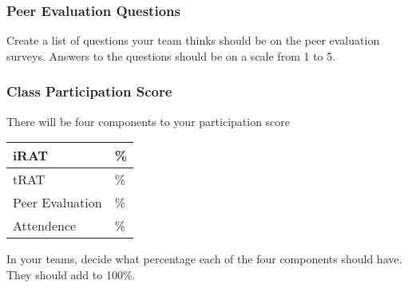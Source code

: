 \documentclass{beamer}
\begin{document}
\begin{frame} \frametitle{Peer Evaluation Questions}
Create a list of questions your team thinks should be on the peer evaluation surveys.  Answers to the questions should be on a scale from 1 to 5.
\vspace{4in}
\end{frame}

\begin{frame} \frametitle{Class Participation Score}
There will be four components to your participation score

\begin{center}
\begin{tabular}{l|l}
\hline 
iRAT & \phantom{xxxx}\%   \\ \hline
tRAT & \phantom{xxxx}\%   \\ \hline
Peer Evaluation & \phantom{xxxx}\%   \\ \hline
Attendence & \phantom{xxxx}\%   \\ \hline
\end{tabular}
\end{center}


In your teams, decide what percentage each of the four components should have.  They should add to 100\%.
\end{frame}
\end{document}

